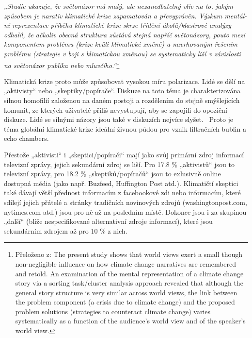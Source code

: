     \setlength\parskip{5mm}
    
    \textit{„Studie ukazuje, že světonázor má malý, ale nezanedbatelný vliv na to, jakým způsobem je narativ klimatické krize zapamatován a převyprávěn. Výzkum mentál-ní reprezentace příběhu klimatické krize skrze třídění úkolů/klastrové analýzy odhalil, že ačkoliv obecná struktura zůstává stejná napříč světonázory, pouto mezi komponentem problému (krize kvůli klimatické změně) a navrhovaným řešením problému (strategie v boji s klimatickou změnou) se systematicky liší v závislosti na světonázor publika nebo mluvčího.“}\footnote{Přeloženo z: The present study shows that world views exert a small though non-negligible influence on how climate
    change narratives are remembered and retold. An examination of the mental representation of a climate change story via a
    sorting task/cluster analysis approach revealed that although the general story structure is very similar across world views, the
    link between the problem component (a crisis due to climate change) and the proposed problem solutions (strategies to
    counteract climate change) varies systematically as a function of the audience’s world view and of the speaker’s world view.}~\citep{bohm2019remembering}
    
    Klimatická krize proto může způsobovat vysokou míru polarizace. Lidé se dělí na „aktivisty“ nebo „skeptiky/popírače“. Diskuze na toto téma je charakterizována silnou homofilií založenou na daném postoji a rozdělením do stejně smýšlejících komunit, ze kterých uživatelé příliš nevystupují, aby se zapojili do opoziční diskuze. Lidé se silnými názory jsou také v diskuzích nejvíce slyšet.~\citep{WILLIAMS2015126} Proto je téma globální klimatické krize ideální živnou půdou pro vznik filtračních bublin a echo chambers.
    
    \setlength\parskip{0mm}
    
    Přestože „aktivisti“ i „skeptici/popírači“ mají jako svůj primární zdroj informací televizní zprávy, jejich sekundární zdroj se liší. Pro 17.8 \% „aktivistů“ jsou to televizní zprávy, pro 18.2 \% „skeptiků/popíračů“ jsou to exlusivně online dostupná média (jako např. Buzfeed, Huffington Post atd.). Klimatičtí skeptici také dávají větší přednost informacím z facebookové zdi nebo informacím, které sdílejí jejich přátelé a stránky tradičních novinových zdrojů (washingtonpost.com, nytimes.com atd.) jsou pro ně až na posledním místě. Dokonce jsou i za skupinou „další“ (blíže nespecifikované alternativní zdroje informací), které jsou sekundárním zdrojem až pro 10 \% z nich.  
    

